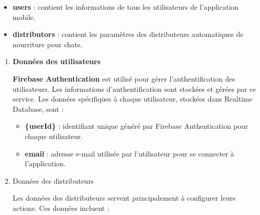 \begin{itemize}
\item \textbf{users} : contient les informations de tous les utilisateurs de l'application mobile.
\item \textbf{distributors} : contient les paramètres des distributeurs automatiques de nourriture pour chats.
\end{itemize}

\begin{enumerate}[label=\alph*)]
\item \textbf{Données des utilisateurs} 

\textbf{Firebase Authentication} est utilisé pour gérer l'authentification des utilisateurs. Les informations d'authentification sont stockées et gérées par ce service. Les données spécifiques à chaque utilisateur, stockées dans Realtime Database, sont :

\begin{itemize}
\item \textbf{\{userId\}} : identifiant unique généré par Firebase Authentication pour chaque utilisateur.
\item \textbf{email} : adresse e-mail utilisée par l'utilisateur pour se connecter à l'application.
\end{itemize}

\item{Données des distributeurs} 

Les données des distributeurs servent principalement à configurer leurs actions. Ces données incluent :


\end{enumerate}
